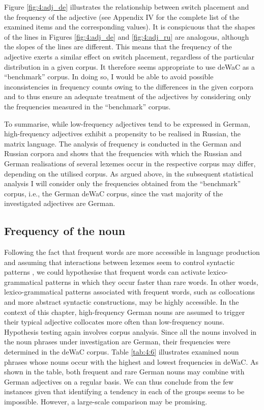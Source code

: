 Figure \ref{fig:4:adj_de} illustrates the relationship between switch placement and the frequency of the adjective (see Appendix IV for the complete list of the examined items and the corresponding values). It is conspicuous that the shapes of the lines in Figures \ref{fig:4:adj_de} and \ref{fig:4:adj_ru} are analogous, although the slopes of the lines are different. This means that the frequency of the adjective exerts a similar effect on switch placement, regardless of the particular distribution in a given corpus. It therefore seems appropriate to use deWaC as a “benchmark” corpus. In doing so, I would be able to avoid possible inconsistencies in frequency counts owing to the differences in the given corpora and to thus ensure an adequate treatment of the adjectives by considering only the frequencies measured in the “benchmark” corpus.

To summarise, while low-frequency adjectives tend to be expressed in German, high-frequency adjectives exhibit a propensity to be realised in Russian, the matrix language. The analysis of frequency is conducted in the German and Russian corpora and shows that the frequencies with which the Russian and German realisations of several lexemes occur in the respective corpus may differ, depending on the utilised corpus. As argued above, in the subsequent statistical analysis I will consider only the frequencies obtained from the “benchmark” corpus, i.e., the German deWaC corpus, since the vast majority of the investigated adjectives are German.

\subsection{Frequency of the noun}
\begin{sloppypar}
Following the fact that frequent words are more accessible in language production and assuming that interactions between lexemes seem to control syntactic patterns \citep[][115]{macwhinney1997}, we could hypothesise that frequent words can activate lexico-grammatical patterns in which they occur faster than rare words. In other words, lexico-grammatical patterns associated with frequent words, such as collocations and more abstract syntactic constructions, may be highly accessible. In the context of this chapter, high-frequency German nouns are assumed to trigger their typical adjective collocates more often than low-frequency nouns. Hypothesis testing again involves corpus analysis. Since all the nouns involved in the noun phrases under investigation are German, their frequencies were determined in the deWaC corpus. Table \ref{tab:4:6} illustrates examined noun phrases whose nouns occur with the highest and lowest frequencies in deWaC. As shown in the table, both frequent and rare German nouns may combine with German adjectives on a regular basis. We can thus conclude from the few instances given that identifying a tendency in each of the groups seems to be impossible. However, a large-scale comparison may be promising.
\end{sloppypar}

